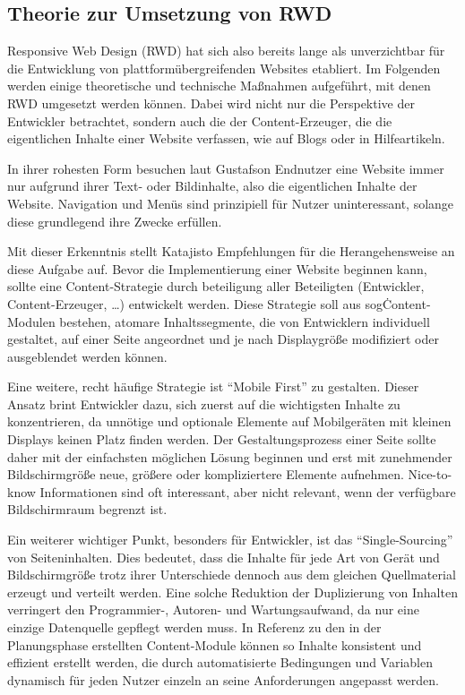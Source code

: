 
\subsection{Theorie zur Umsetzung von RWD}

Responsive Web Design (RWD) hat sich also bereits lange als unverzichtbar für die Entwicklung von plattformübergreifenden Websites etabliert.
Im Folgenden werden einige theoretische und technische Maßnahmen aufgeführt, mit denen RWD umgesetzt werden können.
Dabei wird nicht nur die Perspektive der Entwickler betrachtet, sondern auch die der Content-Erzeuger, die die eigentlichen Inhalte einer Website verfassen, wie auf Blogs oder in Hilfeartikeln.

In ihrer rohesten Form besuchen laut Gustafson \autocite[Kap. 1]{Gustafson.AdaptiveWebDesign.2011} Endnutzer eine Website immer nur aufgrund ihrer Text- oder Bildinhalte, also die eigentlichen Inhalte der Website.
Navigation und Menüs sind prinzipiell für Nutzer uninteressant, solange diese grundlegend ihre Zwecke erfüllen.

Mit dieser Erkenntnis stellt Katajisto \autocite[S. 4]{Katajisto.CreatingSupportContent.2015} Empfehlungen für die Herangehensweise an diese Aufgabe auf.
Bevor die Implementierung einer Website beginnen kann, sollte eine Content-Strategie durch beteiligung aller Beteiligten (Entwickler, Content-Erzeuger, \ldots) entwickelt werden.
Diese Strategie soll aus sog\. Content-Modulen bestehen, atomare Inhaltssegmente, die von Entwicklern individuell gestaltet, auf einer Seite angeordnet und je nach Displaygröße modifiziert oder ausgeblendet werden können.

Eine weitere, recht häufige Strategie ist "`Mobile First"' \autocite{Wroblewski.MobileFirst.2009} zu gestalten.
Dieser Ansatz brint Entwickler dazu, sich zuerst auf die wichtigsten Inhalte zu konzentrieren, da unnötige und optionale Elemente auf Mobilgeräten mit kleinen Displays keinen Platz finden werden.
Der Gestaltungsprozess einer Seite sollte daher mit der einfachsten möglichen Lösung beginnen und erst mit zunehmender Bildschirmgröße neue, größere oder kompliziertere Elemente aufnehmen.
Nice-to-know Informationen sind oft interessant, aber nicht relevant, wenn der verfügbare Bildschirmraum begrenzt ist.

Ein weiterer wichtiger Punkt, besonders für Entwickler, ist das "`Single-Sourcing"' \autocite[S. 3--4]{Katajisto.CreatingSupportContent.2015} von Seiteninhalten.
Dies bedeutet, dass die Inhalte für jede Art von Gerät und Bildschirmgröße trotz ihrer Unterschiede dennoch aus dem gleichen Quellmaterial erzeugt und verteilt werden.
Eine solche Reduktion der Duplizierung von Inhalten verringert den Programmier-, Autoren- und Wartungsaufwand, da nur eine einzige Datenquelle gepflegt werden muss.
In Referenz zu den in der Planungsphase erstellten Content-Module können so Inhalte konsistent und effizient erstellt werden, die durch automatisierte Bedingungen und Variablen dynamisch für jeden Nutzer einzeln an seine Anforderungen angepasst werden.

